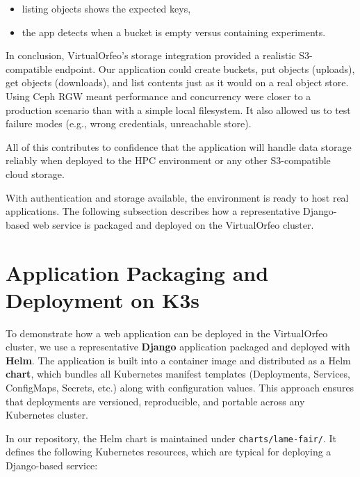 \begin{itemize}
	\item listing objects shows the expected keys,  
	\item the app detects when a bucket is empty versus containing experiments.  
\end{itemize}

\medskip

In conclusion, VirtualOrfeo’s storage integration provided a realistic 
S3-compatible endpoint. Our application could create buckets, put objects 
(uploads), get objects (downloads), and list contents just as it would on a real 
object store. Using Ceph RGW meant performance and concurrency were closer to a 
production scenario than with a simple local filesystem. It also allowed us to 
test failure modes (e.g., wrong credentials, unreachable store).  

All of this contributes to confidence that the application will handle data 
storage reliably when deployed to the HPC environment or any other S3-compatible 
cloud storage.

\medskip
\noindent With authentication and storage available, the environment is ready 
to host real applications. 
The following subsection describes how a representative Django-based web service 
is packaged and deployed on the VirtualOrfeo cluster.


\section{Application Packaging and Deployment on K3s}

To demonstrate how a web application can be deployed in the VirtualOrfeo cluster, 
we use a representative \textbf{Django} application packaged and deployed with 
\textbf{Helm}. The application is built into a container image and distributed 
as a Helm \textbf{chart}, which bundles all Kubernetes manifest templates 
(Deployments, Services, ConfigMaps, Secrets, etc.) along with configuration 
values. This approach ensures that deployments are versioned, reproducible, and 
portable across any Kubernetes cluster.

\medskip

In our repository, the Helm chart is maintained under \texttt{charts/lame-fair/}. 
It defines the following Kubernetes resources, which are typical for deploying a 
Django-based service:  

